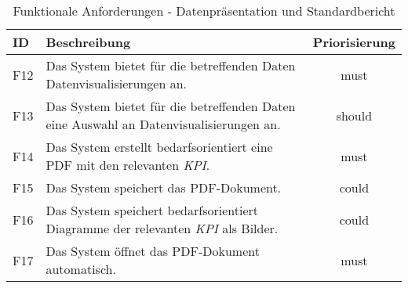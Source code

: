 \begingroup
\setlength{\tabcolsep}{10pt} %
\renewcommand{\arraystretch}{1.0} 
\begin{table}[H]
    \centering
    \begin{adjustbox}{max width=\textwidth}
    \begin{tabular}{lp{14cm}c}
       \toprule
       \textbf{ID}          & \textbf{Beschreibung} &\textbf{Priorisierung}\\
       \midrule
        F12                              &Das System bietet für die betreffenden Daten Datenvisualisierungen an. & must\\
        F13                              &Das System bietet für die betreffenden Daten eine Auswahl an Datenvisualisierungen an. & should\\
        F14                              &Das System erstellt bedarfsorientiert eine PDF mit den relevanten \textit{\acrshort{KPI}}. & must\\
        F15                              &Das System speichert das PDF-Dokument. & could\\
        F16                              &Das System speichert bedarfsorientiert Diagramme der relevanten \textit{\acrshort{KPI}} als Bilder. & could\\
        F17                              &Das System öffnet das PDF-Dokument automatisch. & must\\
        \bottomrule
    \end{tabular}
    \end{adjustbox}
    \caption{%
        Funktionale Anforderungen - Datenpräsentation und Standardbericht
    }
    \label{tab:funktionale Anforderungen III}
    \end{table}
\endgroup






